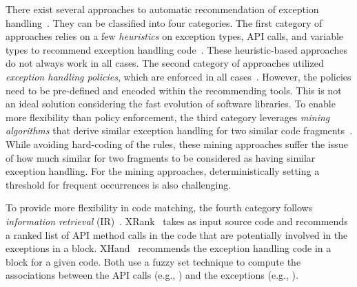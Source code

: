There exist several approaches to automatic recommendation of 
exception
handling~\cite{barbosa-bsse12,chanchal-scam14,barbosa-tse18,barbosa-tse16,xrank-fse20,throw-ase22}. They
can be classified into four categories. The first category of
approaches relies on a few {\em heuristics} on exception types, API
calls, and variable types to recommend exception handling
code~\cite{barbosa-bsse12}. These heuristic-based approaches do not
always work in all cases. The second category of approaches
utilized {\em exception handling policies}, which are enforced in all
cases~\cite{barbosa-tse16,barbosa-saner18}. However, the policies need
to be pre-defined and encoded within the recommending tools.  This is not
an ideal solution considering the fast evolution of software
libraries. To enable more flexibility than policy enforcement, the
third category leverages {\em mining algorithms} that derive
similar exception handling for two similar code
fragments~\cite{chanchal-scam14}. While avoiding hard-coding of
the rules, these mining approaches suffer the issue of how much similar
for two fragments to be considered as having similar exception
handling. For the mining approaches, deterministically setting a
threshold for frequent occurrences is also challenging.

To provide more flexibility in code matching, the fourth category
follows {\em information retrieval}
(IR)~\cite{xrank-fse20}. XRank~\cite{xrank-fse20} takes as input
source code and recommends a ranked list of API method calls in the
code that are potentially involved in the exceptions in a 
block. XHand~\cite{xrank-fse20} recommends the exception handling
code in a  block for a given code. Both use a fuzzy set
technique to compute the associations between the API calls (e.g.,
) and the exceptions (e.g.,
).

